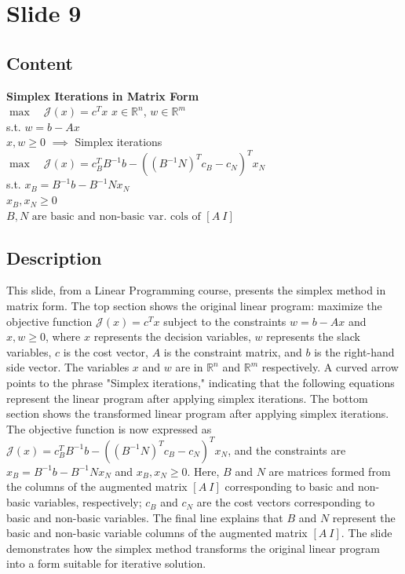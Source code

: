 \documentclass{article}%
\begin{document}
%
\newpage%
\section{Slide 9}%
\label{sec:Slide9}%
\subsection{Content}%

\textbf{Simplex Iterations in Matrix Form} \\
$\max \quad \mathcal{J}(x) = c^T x$
\qquad $x \in \mathbb{R}^n$, $w \in \mathbb{R}^m$ \\
s.t. \quad $w = b - Ax$ \\
\qquad $x, w \ge 0$
\qquad $\implies$ Simplex iterations \\
$\max \quad \mathcal{J}(x) = c_B^T B^{-1} b - ( (B^{-1}N)^T c_B - c_N)^T x_N$ \\
s.t. \quad $x_B = B^{-1} b - B^{-1} N x_N$ \\
\qquad $x_B, x_N \ge 0$ \\
$B, N \text{ are basic and non-basic var. cols of } [A \ I]$
%
\subsection{Description}%
This slide, from a Linear Programming course, presents the simplex method in matrix form. The top section shows the original linear program: maximize the objective function $\mathcal{J}(x) = c^Tx$ subject to the constraints $w = b - Ax$ and $x, w \ge 0$, where $x$ represents the decision variables, $w$ represents the slack variables, $c$ is the cost vector, $A$ is the constraint matrix, and $b$ is the right-hand side vector. The variables $x$ and $w$ are in $\mathbb{R}^n$ and $\mathbb{R}^m$ respectively.  A curved arrow points to the phrase "Simplex iterations," indicating that the following equations represent the linear program after applying simplex iterations. The bottom section shows the transformed linear program after applying simplex iterations. The objective function is now expressed as $\mathcal{J}(x) = c_B^T B^{-1} b - ((B^{-1}N)^T c_B - c_N)^T x_N$, and the constraints are $x_B = B^{-1} b - B^{-1} N x_N$ and $x_B, x_N \ge 0$. Here, $B$ and $N$ are matrices formed from the columns of the augmented matrix $[A \ I]$ corresponding to basic and non-basic variables, respectively; $c_B$ and $c_N$ are the cost vectors corresponding to basic and non-basic variables. The final line explains that $B$ and $N$ represent the basic and non-basic variable columns of the augmented matrix $[A \ I]$. The slide demonstrates how the simplex method transforms the original linear program into a form suitable for iterative solution.%
\end{document}
